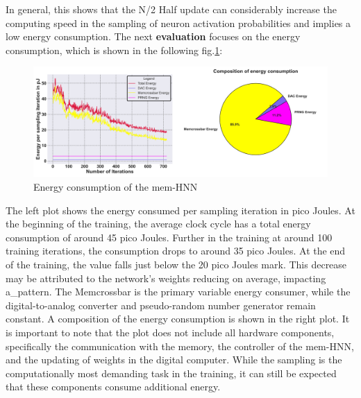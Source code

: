 In general, this shows that the N/2 Half update can considerably increase the computing speed in the sampling of neuron activation probabilities and
implies a low energy consumption.
The next \textbf{evaluation} focuses on the energy consumption, which is shown in the following fig.\ref{Energy output_2}:
\begin{figure}[H]
    \centering
    \includegraphics[width=0.9\linewidth]{graphics/energy_and_averages_plot_4.png}
    \caption{Energy consumption of the \ac{mem-HNN}}
    \label{Energy output_2}
\end{figure}
The left plot shows the energy consumed per sampling iteration in pico Joules.
At the beginning of the training, the average clock cycle has a total energy consumption of around 45 pico Joules.
Further in the training at around 100 training iterations, the consumption drops to around 35 pico Joules. 
At the end of the training, the value falls just below the 20 pico Joules mark. 
This decrease may be attributed to the network's weights reducing on average, impacting a\_pattern.
The Memcrossbar is the primary variable energy consumer, while the digital-to-analog converter and pseudo-random number generator remain constant. 
A composition of the energy consumption is shown in the right plot.
It is important to note that the plot does not include all hardware components,
specifically the communication with the memory, the controller of the \ac{mem-HNN}, and the updating of weights in the digital computer.
While the sampling is the computationally most demanding task in the training, it can still be expected that these components consume additional energy.

